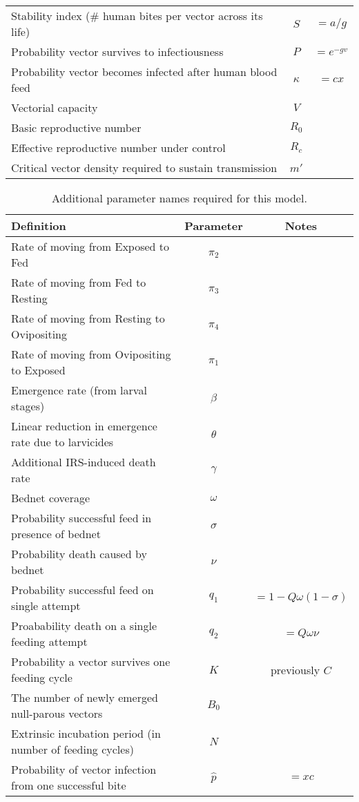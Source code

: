 \documentclass[a4paper,12pt]{article}
\begin{document}
\begin{table*}[h]
\begin{tabular}{l c c}
Stability index (\# human bites per vector across its life) & $S$ & $=a/g$\\
Probability vector survives to infectiousness & $P$ & $=e^{-gv}$\\
Probability vector becomes infected after human blood feed & $\kappa$ & $=cx$\\
Vectorial capacity & $V$ & \\
Basic reproductive number & $R_0$ & \\
Effective reproductive number under control & $R_c$ & \\
Critical vector density required to sustain transmission & $m'$ & \\
\hline%
\end{tabular}
\label{table:param}%
\end{table*}

\begin{table*}[t]
\caption{Additional parameter names required for this model.}%
\vspace{.1cm}
\centering %
\begin{tabular}{l c c}%
\hline\hline                        %
Definition & Parameter & Notes \\ [0.5ex]%
\hline                  %
Rate of moving from Exposed to Fed & $\pi_2$ & \\
Rate of moving from Fed to Resting & $\pi_3$ & \\
Rate of moving from Resting to Ovipositing & $\pi_4$ & \\
Rate of moving from Ovipositing to Exposed & $\pi_1$ & \\
Emergence rate (from larval stages) & $\beta$ & \\
Linear reduction in emergence rate due to larvicides & $\theta$ & \\
Additional IRS-induced death rate & $\gamma$ & \\
Bednet coverage & $\omega$ & \\
Probability successful feed in presence of bednet & $\sigma$ & \\
Probability death caused by bednet & $\nu$ & \\
Probability successful feed on single attempt & $q_1$ & $=1-Q\omega(1-\sigma)$ \\
Proabability death on a single feeding attempt & $q_2$ & $=Q\omega\nu$\\
Probability a vector survives one feeding cycle & $K$ & previously $C$\\
The number of newly emerged null-parous vectors & $B_0$ &\\
Extrinsic incubation period (in number of feeding cycles) & $N$ & \\
Probability of vector infection from one successful bite & $\hat{p}$ & $=xc$ \\
\hline%
\end{tabular}
\label{table:param2}%
\end{table*}
\end{document}

